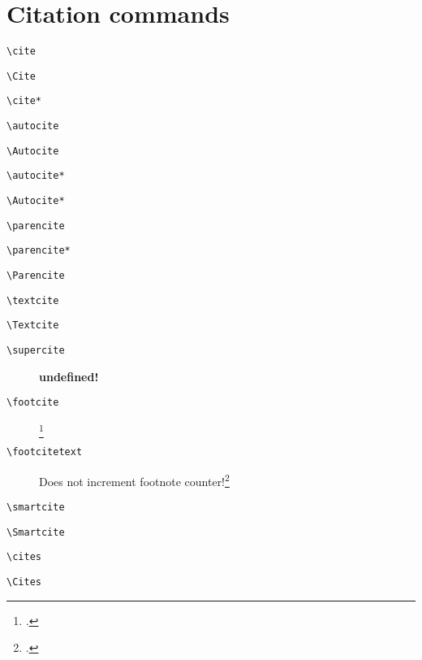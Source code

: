 \documentclass[a4paper,12pt]{scrartcl}
\newcommand*{\Befehl}[1]{\texttt{\textbackslash#1}}
\begin{document}
\section{Citation commands}

\begin{description}
    \item[\footnotesize\Befehl{cite}] \cite[159--187]{auler:hiller:2015}
    \item[\footnotesize\Befehl{Cite}] \Cite[159--187]{auler:hiller:2015}
    \item[\footnotesize\Befehl{cite*}] \cite*[159--187]{auler:hiller:2015}
    \item[\footnotesize\Befehl{autocite}] \autocite[159--187]{auler:hiller:2015a}
    \item[\footnotesize\Befehl{Autocite}] \Autocite[159--187]{auler:hiller:2015a}
    \item[\footnotesize\Befehl{autocite*}] \autocite*[159--187]{auler:hiller:2015a}
    \item[\footnotesize\Befehl{Autocite*}] \Autocite*[159--187]{auler:hiller:2015a}
    \item[\footnotesize\Befehl{parencite}] \parencite[159--187]{auler:hiller:2015}
    \item[\footnotesize\Befehl{parencite*}] \parencite*[159--187]{auler:hiller:2015}
    \item[\footnotesize\Befehl{Parencite}] \Parencite[159--187]{auler:hiller:2015}
    \item[\footnotesize\Befehl{textcite}] \textcite[159--187]{auler:hiller:2015}
    \item[\footnotesize\Befehl{Textcite}] \Textcite[159--187]{auler:hiller:2015}
	\item[\footnotesize\Befehl{supercite}] 
        {\supercite[433]{bauchhenss:et:al:1978}}
        {\textbf{undefined!}}%
    \item[\footnotesize\Befehl{footcite}] \footcite[159--187]{auler:hiller:2015}
	\item[\footnotesize\Befehl{footcitetext}] Does not increment footnote counter!\footcitetext[159--187]{auler:hiller:2015}
    \item[\footnotesize\Befehl{smartcite}] \smartcite[159--187]{auler:hiller:2015}
    \item[\footnotesize\Befehl{Smartcite}] \smartcite[159--187]{auler:hiller:2015}
    \item[\footnotesize\Befehl{cites}] \cites[159--187]{auler:hiller:2015}
    \item[\footnotesize\Befehl{Cites}] \Cites[159--187]{auler:hiller:2015}

\end{description}
\end{document}
